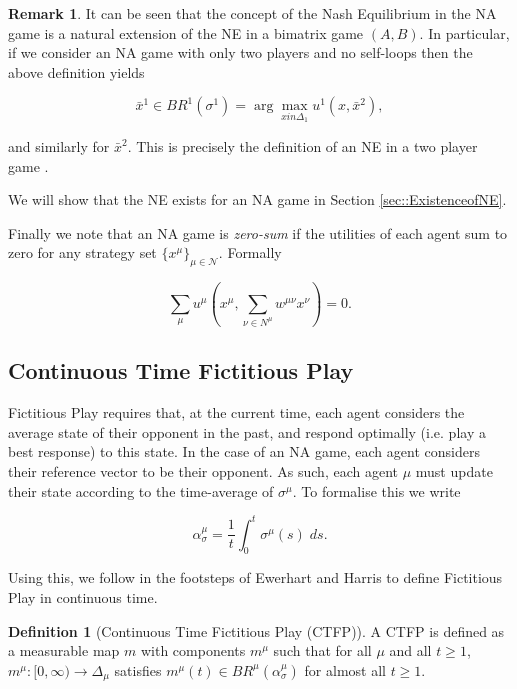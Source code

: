 \documentclass{article}
\theoremstyle{definition}
\newtheorem*{definition}{Definition}
\newtheorem*{remark}{Remark}
\newcommand{\agentset}{\mathcal{N}}
\newcommand{\wmunu}{w^{\mu \nu}}
\newcommand{\xmu}{x^{\mu}}
\newcommand{\xnu}{x^{\nu}}
\newcommand{\refmu}{\sigma^{\mu}}
\newcommand{\avgref}[1]{\alpha_\sigma^{#1}}
\newcommand{\NE}[1]{\bar{x}^{#1}}
\newcommand{\weightedsum}{ \sum_{\nu \in N^\mu} \wmunu \xnu}
\begin{document}
  \begin{remark}
    It can be seen that the concept of the Nash Equilibrium in the NA game is a natural
    extension of the NE in a bimatrix game $(A, B)$. In particular, if we consider an NA game
    with only two players and no self-loops then the above definition yields

    \begin{equation*}
      \NE{1} \in BR^1 (\sigma^1) = \arg \max_{x in \Delta_1} u^1 (x, \NE{2}), 
    \end{equation*}

    and similarly for $\NE{2}$. This is precisely the definition of an NE in a two player game \cite{}.
  \end{remark}

  We will show that the NE exists for an NA game in Section \ref{sec::ExistenceofNE}. 

  Finally we note that an NA game is \emph{zero-sum} if the utilities of each agent sum to zero for any strategy set $\{ \xmu \}_{\mu \in \agentset}$. Formally

  \begin{equation}
    \sum_\mu u^\mu(\xmu, \weightedsum) = 0.
  \end{equation}

\subsection{Continuous Time Fictitious Play}
\label{sec::CTFP}

  Fictitious Play requires that, at the current time, each agent considers the average state
  of their opponent in the past, and respond optimally (i.e. play a best response) to this state. In the case of an NA game, each agent considers their reference vector to be their
  opponent. As such, each agent $\mu$ must update their state according to the time-average of
  $\refmu$. To formalise this we write

  \begin{equation}
    \avgref{\mu} = \frac{1}{t} \int_0^t \refmu(s) \; ds.
  \end{equation}

  Using this, we follow in the footsteps of Ewerhart \cite{} and Harris \cite{} to define
  Fictitious Play in continuous time.
%
  \begin{definition}[Continuous Time Fictitious Play (CTFP)]
    A CTFP is defined as a measurable map $m$ with components $m^\mu$ such that for all $\mu$
    and all $t \geq 1$, $m^\mu: [0, \infty) \rightarrow \Delta_\mu$ satisfies $m^\mu(t) \in
    BR^\mu(\alpha_{\sigma}^\mu)$ for almost all $t \geq 1$.
  \end{definition}
\end{document}
